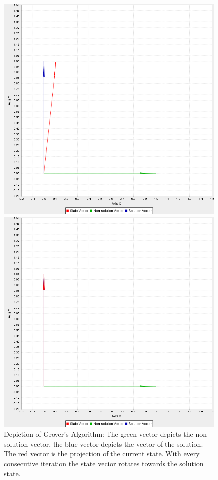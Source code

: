 \documentclass[bibliography=totocnumbered, 10pt]{article}
\theoremstyle{NoticeStyle}
\begin{document}
\begin{figure}[H]
\begin{minipage}{0.33\textwidth}
	\end{minipage}
	\begin{minipage}{0.33\textwidth}
		\includegraphics[width=\textwidth]{img/pic_12.png}
	\end{minipage}
	\begin{minipage}{0.33\textwidth}
		\includegraphics[width=\textwidth]{img/pic_13.png}
	\end{minipage}
	\caption{Depiction of Grover's Algorithm: The green vector depicts the non-solution vector, the blue vector depicts the vector of the solution. The red vector is the projection of the current state. With every consecutive iteration the state vector rotates towards the solution state.}
	\label{grover_rotation}
\end{figure}
\end{document}
